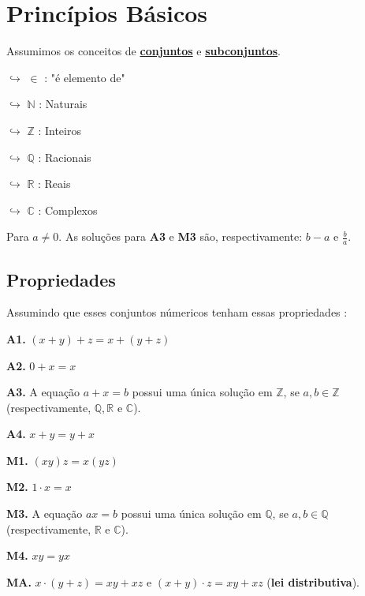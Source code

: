 \section*{Princípios Básicos}

Assumimos os conceitos de \underline{\textbf{conjuntos}} e \underline{\textbf{subconjuntos}}.

$\hookrightarrow$ $\in$ : "é elemento de"

$\hookrightarrow$ $\mathbb{N}$ : Naturais

$\hookrightarrow$ $\mathbb{Z}$ : Inteiros

$\hookrightarrow$ $\mathbb{Q}$ : Racionais

$\hookrightarrow$ $\mathbb{R}$ : Reais

$\hookrightarrow$ $\mathbb{C}$ : Complexos

\begin{exemplo}
Para $a \neq 0$. As soluções para \textbf{A3} e \textbf{M3} são, respectivamente: $b-a$ e $\frac{b}{a}$.
\end{exemplo}

\subsection*{Propriedades}
Assumindo que esses conjuntos númericos tenham essas propriedades : 

\textbf{A1.} $(x + y) + z = x + (y + z)$

\textbf{A2.} $0 + x = x$

\textbf{A3.} A equação $a + x = b$ possui uma única solução em $\mathbb{Z}$, se $a,b \in \mathbb{Z}$ (respectivamente, $\mathbb{Q},\mathbb{R}$ e $\mathbb{C}$).

\textbf{A4.} $x + y = y + x$

\textbf{M1.} $(xy)z = x (yz)$

\textbf{M2.} $1 \cdot x = x$

\textbf{M3.} A equação $ax = b$ possui uma única solução em $\mathbb{Q}$, se $a,b \in \mathbb{Q}$ (respectivamente, $\mathbb{R}$ e $\mathbb{C}$).

\textbf{M4.} $xy = yx$

\textbf{MA.} $x \cdot (y + z) = xy + xz$ e $(x + y) \cdot z = xy + xz$ (\textbf{lei distributiva}). \\ 
\vspace{0.005cm}


